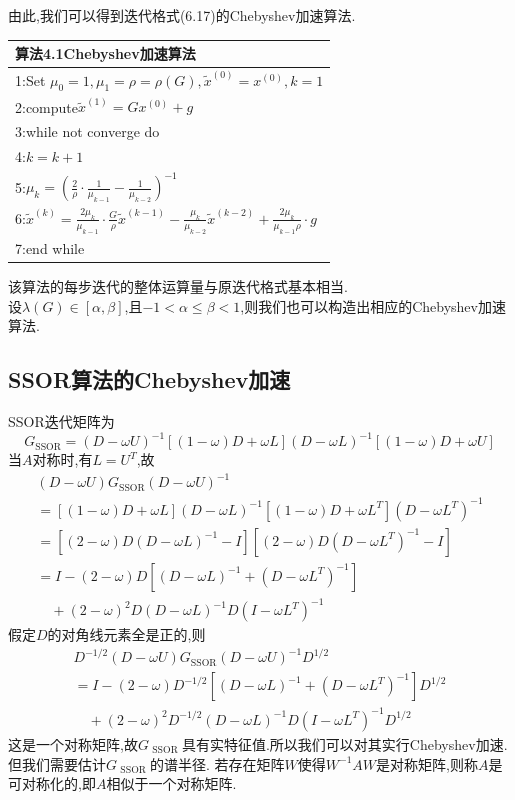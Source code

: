 \documentclass[12pt,a4paper]{article}
\begin{document}
由此,我们可以得到迭代格式(6.17)的Chebyshev加速算法.\\
\begin{tabular}{l}
\hline
{\color{blue}算法4.1}Chebyshev加速算法\\
\hline
1:Set $\mu_{0}=1, \mu_{1}=\rho=\rho(G), \tilde{x}^{(0)}=x^{(0)}, k=1$\\
2:compute$\tilde{x}^{(1)}=G x^{(0)}+g$\\
3:while not converge do\\
4:\qquad$k=k+1$\\
5:\qquad$\mu_{k}=\left(\frac{2}{\rho} \cdot \frac{1}{\mu_{k-1}}-\frac{1}{\mu_{k-2}}\right)^{-1}$\\
6:\qquad$\tilde{x}^{(k)}=\frac{2 \mu_{k}}{\mu_{k-1}} \cdot \frac{G}{\rho} \tilde{x}^{(k-1)}-\frac{\mu_{k}}{\mu_{k-2}} \tilde{x}^{(k-2)}+\frac{2 \mu_{k}}{\mu_{k-1} \rho} \cdot g$\\
7:end while\\
\hline
\end{tabular}
该算法的每步迭代的整体运算量与原迭代格式基本相当.\\
设$\lambda(G) \in[\alpha, \beta]$,且$-1<\alpha \leq \beta<1$,则我们也可以构造出相应的Chebyshev加速算法.\\
\subsection*{SSOR算法的Chebyshev加速}
SSOR迭代矩阵为
$$
G_{\mathrm{SSOR}}=(D-\omega U)^{-1}[(1-\omega) D+\omega L](D-\omega L)^{-1}[(1-\omega) D+\omega U]
$$
当$A$对称时,有$L=U^{T}$,故
$$
\begin{array}{l}{(D-\omega U) G_{\mathrm{SSOR}}(D-\omega U)^{-1}} \\ {=[(1-\omega) D+\omega L](D-\omega L)^{-1}\left[(1-\omega) D+\omega L^{T}\right]\left(D-\omega L^{T}\right)^{-1}} \\ {=\left[(2-\omega) D(D-\omega L)^{-1}-I\right]\left[(2-\omega) D\left(D-\omega L^{T}\right)^{-1}-I\right]} \\ {=I-(2-\omega) D\left[(D-\omega L)^{-1}+\left(D-\omega L^{T}\right)^{-1}\right]} \\ {\quad+(2-\omega)^{2} D(D-\omega L)^{-1} D\left(I-\omega L^{T}\right)^{-1}}\end{array}
$$
假定$D$的对角线元素全是正的,则
$$
\begin{array}{l}{D^{-1 / 2}(D-\omega U) G_{\mathrm{SSOR}}(D-\omega U)^{-1} D^{1 / 2}} \\ {=I-(2-\omega) D^{-1 / 2}\left[(D-\omega L)^{-1}+\left(D-\omega L^{T}\right)^{-1}\right] D^{1 / 2}} \\ {\quad+(2-\omega)^{2} D^{-1 / 2}(D-\omega L)^{-1} D\left(I-\omega L^{T}\right)^{-1} D^{1 / 2}}\end{array}
$$
这是一个对称矩阵,故$G_{\text { SSOR }}$具有实特征值.所以我们可以对其实行Chebyshev加速.但我们需要估计$G_{\text { SSOR }}$的谱半径.
若存在矩阵$W$使得$W^{-1} A W$是对称矩阵,则称$A$是可对称化的,即$A$相似于一个对称矩阵.\\
\end{document}
